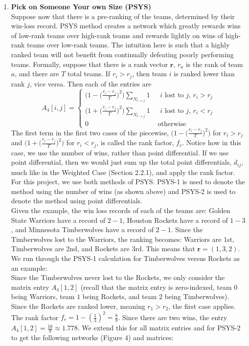 \documentclass[12pt]{article}%
\begin{document}
\begin{enumerate}
  \item \textbf{Pick on Someone Your own Size (PSYS)}\\
  \null\quad\quad Suppose now that there is a pre-ranking of the teams, determined by their win-loss record. PSYS method creates a network which greatly rewards wins of low-rank teams over high-rank teams and rewards lightly on wins of high-rank teams over low-rank teams. The intuition here is such that a highly ranked team will not benefit from continually defeating poorly performing teams. Formally, suppose that there is a rank vector $\textbf{r}$, $r_a$ is the rank of team $a$, and there are $T$ total teams. If $r_i > r_j$, then team $i$ is ranked lower than rank $j$, vice versa. Then each of the entries are
  \[
  A_{4}[i,j]=
  \begin{cases}
  \Big(1-\Big(\frac{r_i-r_j}{T}\Big)^2\Big)\sum_{N_{i\rightarrow j}}1 &\text{ $i$ lost to $j$, }r_i > r_j\\
  \Big(1+\Big(\frac{r_i-r_j}{T}\Big)^2\Big)\sum_{N_{i\rightarrow j}}1 &\text{ $i$ lost to $j$, }r_i < r_j\\
  0 &\text{ otherwise}
  \end{cases}
  \]
  The first term in the first two cases of the piecewise, $\Big(1-\Big(\frac{r_i-r_j}{T}\Big)^2\Big)$ for $r_i > r_j$ and $\Big(1+\Big(\frac{r_i-r_j}{T}\Big)^2\Big)$ for $r_i < r_j$, is called the rank factor, $f_r$. Notice how in this case, we use the number of wins, rather than point differential. If we use point differential, then we would just sum up the total point differentials, $d_{ij}$, much like in the Weighted Case (Section 2.2.1), and apply the rank factor. For this project, we use both methods of PSYS. PSYS-1 is used to denote the method using the number of wins (as shown above) and PSYS-2 is used to denote the method using point differentials.\\
  \null\quad\quad Given the example, the win loss records of each of the teams are: Golden State Warriors have a record of $2-1$, Houston Rockets have a record of $1-3$, and Minnesota Timberwolves have a record of $2-1$. Since the Timberwolves lost to the Warriors, the ranking becomes: Warriors are 1st, Timberwolves are 2nd, and Rockets are 3rd. This means that $\textbf{r}=(1,3,2)$. We run through the PSYS-1 calculation for Timberwolves versus Rockets as an example:\\
  \null\quad\quad Since the Timberwolves never lost to the Rockets, we only consider the matrix entry $A_4[1,2]$ (recall that the matrix entry is zero-indexed, team $0$ being Warriors, team $1$ being Rockets, and team $2$ being Timberwolves). Since the Rockets are ranked lower, meaning $r_1>r_2$, the first case applies. The rank factor $f_r=1-(\frac{1}{3})^2=\frac{8}{9}$. Since there are two wins, the entry $A_4[1,2]=\frac{16}{9}\approx 1.778$. We extend this for all matrix entries and for PSYS-2 to get the following networks (Figure 4) and matrices:

\end{enumerate}
\end{document}
